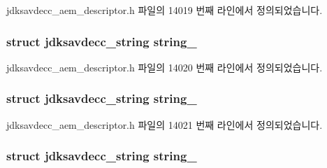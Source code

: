 jdksavdecc\+\_\+aem\+\_\+descriptor.\+h 파일의 14019 번째 라인에서 정의되었습니다.

\subsubsection[{\texorpdfstring{string\+\_\+1}{string_1}}]{\setlength{\rightskip}{0pt plus 5cm}struct {\bf jdksavdecc\+\_\+string} string\+\_}\hypertarget{structjdksavdecc__descriptor__strings_a74069f3a05ccbf123fc33d25e826408f}{}\label{structjdksavdecc__descriptor__strings_a74069f3a05ccbf123fc33d25e826408f}


jdksavdecc\+\_\+aem\+\_\+descriptor.\+h 파일의 14020 번째 라인에서 정의되었습니다.

\subsubsection[{\texorpdfstring{string\+\_\+2}{string_2}}]{\setlength{\rightskip}{0pt plus 5cm}struct {\bf jdksavdecc\+\_\+string} string\+\_}\hypertarget{structjdksavdecc__descriptor__strings_a2faecc14963d86b076a4a99a19794698}{}\label{structjdksavdecc__descriptor__strings_a2faecc14963d86b076a4a99a19794698}


jdksavdecc\+\_\+aem\+\_\+descriptor.\+h 파일의 14021 번째 라인에서 정의되었습니다.

\subsubsection[{\texorpdfstring{string\+\_\+3}{string_3}}]{\setlength{\rightskip}{0pt plus 5cm}struct {\bf jdksavdecc\+\_\+string} string\+\_}\hypertarget{structjdksavdecc__descriptor__strings_a8d22d22c70580e2881107d33d5699668}{}\label{structjdksavdecc__descriptor__strings_a8d22d22c70580e2881107d33d5699668}


